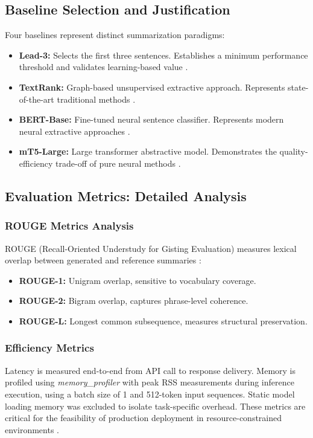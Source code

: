 \documentclass[conference]{IEEEtran}
\begin{document}
\begin{itemize}
\subsection{Baseline Selection and Justification}
Four baselines represent distinct summarization paradigms:

\begin{itemize}
    \item \textbf{Lead-3:} Selects the first three sentences. Establishes a minimum performance threshold and validates learning-based value \cite{8}.
    \item \textbf{TextRank:} Graph-based unsupervised extractive approach. Represents state-of-the-art traditional methods \cite{7}.
    \item \textbf{BERT-Base:} Fine-tuned neural sentence classifier. Represents modern neural extractive approaches \cite{11}.
    \item \textbf{mT5-Large:} Large transformer abstractive model. Demonstrates the quality-efficiency trade-off of pure neural methods \cite{4}.
\end{itemize}


\subsection{Evaluation Metrics: Detailed Analysis}
\subsubsection{ROUGE Metrics Analysis}
ROUGE (Recall-Oriented Understudy for Gisting Evaluation) measures lexical overlap between generated and reference summaries \cite{6}:
\begin{itemize}
    \item \textbf{ROUGE-1:} Unigram overlap, sensitive to vocabulary coverage.
    \item \textbf{ROUGE-2:} Bigram overlap, captures phrase-level coherence.
    \item \textbf{ROUGE-L:} Longest common subsequence, measures structural preservation.
\end{itemize}

\subsubsection{Efficiency Metrics}
Latency is measured end-to-end from API call to response delivery. Memory is profiled using \textit{memory\_profiler} with peak RSS measurements during inference execution, using a batch size of 1 and 512-token input sequences. Static model loading memory was excluded to isolate task-specific overhead. These metrics are critical for the feasibility of production deployment in resource-constrained environments \cite{13, 16}.


\end{itemize}
\end{document}
